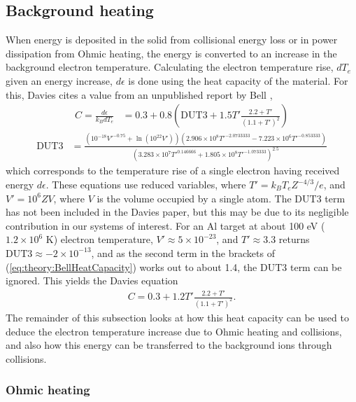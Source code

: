 \documentclass[12pt]{article}
\numberwithin{equation}{section}
\begin{document}
\subsection{Background heating} \label{sec:theory:heat}

When energy is deposited in the solid from collisional energy loss or in power dissipation from Ohmic heating, the energy is converted to an increase in the background electron temperature. Calculating the electron temperature rise, $d T_e$ given an energy increase, $d\epsilon$ is done using the heat capacity of the material. For this, Davies \cite{hybrid:Davies:2002} cites a value from an unpublished report by Bell \cite{theory:heatCap:Bell},
%
\begin{align} \label{eq:theory:BellHeatCapacity}
 C=\frac{d\epsilon}{k_BdT_e} &= 0.3 + 0.8\left(\text{DUT3} + 1.5 T' \frac{2.2 + T'}{(1.1 + T')^2}\right)
\end{align}
\begin{align}
 \text{DUT3} &= \frac{(10^{-18}V'^{-0.75} + \ln(10^{22}V'))(2.906\times10^{8}T'^{-2.0733333} - 7.223\times10^6T'^{-0.853333})}{(3.283\times10^7 T'^{0.146666} + 1.805\times10^8 T'^{-1.073333})^{2.5}}
\end{align}
%
which corresponds to the temperature rise of a single electron having received energy $d\epsilon$. These equations use reduced variables, where $T'=k_BT_eZ^{-4/3}/e$, and $V' = 10^{6}ZV$, where $V$ is the volume occupied by a single atom. The $\text{DUT3}$ term has not been included in the Davies paper, but this may be due to its negligible contribution in our systems of interest. For an Al target at about 100 eV ($1.2\times10^6$ K) electron temperature, $V'\approx 5\times 10^{-23}$, and $T' \approx 3.3$ returns $\text{DUT3}\approx-2\times 10^{-13}$, and as the second term in the brackets of (\ref{eq:theory:BellHeatCapacity}) works out to about 1.4, the $\text{DUT3}$ term can be ignored. This yields the Davies equation
%
\begin{align} \label{eq:theory:heatCap}
  C = 0.3 + 1.2 T' \frac{2.2 + T'}{(1.1 + T')^2}.
\end{align}
%
The remainder of this subsection looks at how this heat capacity can be used to deduce the electron temperature increase due to Ohmic heating and collisions, and also how this energy can be transferred to the background ions through collisions.

\subsubsection{Ohmic heating} \label{sec:theory:heat:Ohmic}
\end{document}
